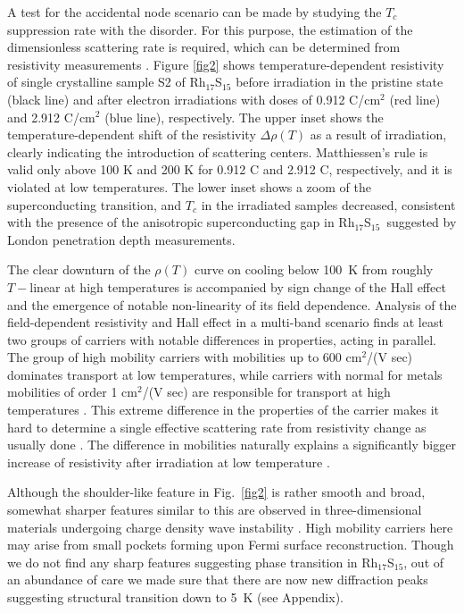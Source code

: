 \documentclass[aps,pra,reprint,superscriptaddress,floatfix]{revtex4-2}
\newcommand{\rhs}{Rh$_{17}$S$_{15}$}
\begin{document}
A test for the accidental node scenario can be made by studying the $T_c$ suppression rate with the disorder. For this purpose, the estimation of the dimensionless scattering rate is required, which can be determined from resistivity measurements \cite{Prozorov2014}.
%
Figure \ref{fig2} shows temperature-dependent resistivity of single crystalline sample S2 of Rh$_{17}$S$_{15}$ before irradiation in the pristine state (black line) and after electron irradiations with doses of 0.912 C/cm$^2$ (red line) and 2.912 C/cm$^2$ (blue line), respectively. The upper inset shows the temperature-dependent shift of the resistivity $\Delta\rho(T)$ as a result of irradiation, clearly indicating the introduction of scattering centers. Matthiessen's rule is valid only above 100 K and 200 K for 0.912 C and 2.912 C, respectively, and it is violated at low temperatures. The lower inset shows a zoom of the superconducting transition, and $T_c$ in the irradiated samples decreased, consistent with the presence of the anisotropic superconducting gap in \rhs~suggested by London penetration depth measurements.
%


The clear downturn of the $\rho(T)$ curve on cooling below 100~K from roughly $T-$linear at high temperatures is accompanied by sign change of the Hall effect \cite{Naren2008,Daou2016} and the emergence of notable non-linearity of its field dependence. Analysis of the field-dependent resistivity and Hall effect in a multi-band scenario finds at least two groups of carriers with notable differences in properties, acting in parallel. The group of high mobility carriers with mobilities up to 600 cm$^2$/(V sec) dominates transport at low temperatures, while carriers with normal for metals mobilities of order 1 cm$^2$/(V sec) are responsible for transport at high temperatures \cite{Daou2016}. 
This extreme difference in the properties of the carrier makes it hard to determine a single effective scattering rate from resistivity change as usually done \cite{Prozorov2014}.
The difference in mobilities naturally explains a significantly bigger increase of resistivity after irradiation at low temperature \cite{Bass1972,BaRuTanatar}.

Although the shoulder-like feature in Fig.~\ref{fig2} is rather smooth and broad, somewhat sharper features similar to this are observed in three-dimensional materials undergoing charge density wave instability \cite{Naito1982}.
High mobility carriers here may arise from small pockets forming upon Fermi surface reconstruction. Though we do not find any sharp features suggesting phase transition in Rh$_{17}$S$_{15}$, out of an abundance of care we made sure that there are now new diffraction peaks suggesting structural transition down to 5~K (see Appendix).
\end{document}
